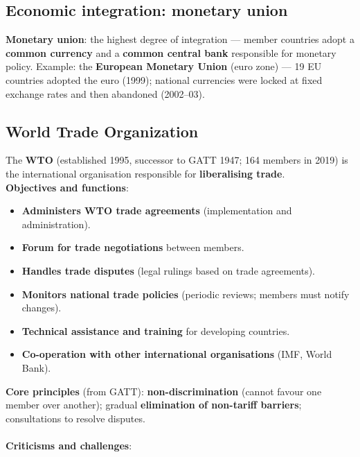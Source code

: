 \subsection{Economic integration: monetary union}
\textbf{Monetary union}: the highest degree of integration --- member countries adopt a \textbf{common currency} and a \textbf{common central bank} responsible for monetary policy. Example: the \textbf{European Monetary Union} (euro zone) --- 19 EU countries adopted the euro (1999); national currencies were locked at fixed exchange rates and then abandoned (2002--03).
\subsection{World Trade Organization}
The \textbf{WTO} (established 1995, successor to GATT 1947; 164 members in 2019) is the international organisation responsible for \textbf{liberalising trade}.
\\\textbf{Objectives and functions}:
\begin{itemize}
  \item \textbf{Administers WTO trade agreements} (implementation and administration).
  \item \textbf{Forum for trade negotiations} between members.
  \item \textbf{Handles trade disputes} (legal rulings based on trade agreements).
  \item \textbf{Monitors national trade policies} (periodic reviews; members must notify changes).
  \item \textbf{Technical assistance and training} for developing countries.
  \item \textbf{Co-operation with other international organisations} (IMF, World Bank).
\end{itemize}
\textbf{Core principles} (from GATT): \textbf{non-discrimination} (cannot favour one member over another); gradual \textbf{elimination of non-tariff barriers}; consultations to resolve disputes.
\\\\
\textbf{Criticisms and challenges}:
